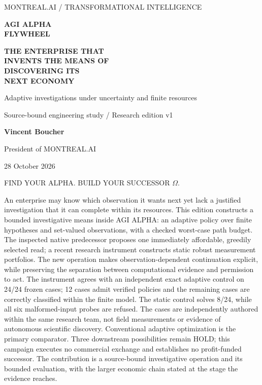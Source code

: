 \documentclass[10pt,letterpaper]{article}
\begin{document}
\begin{titlepage}
\thispagestyle{empty}
\color{purple}
{\sffamily\small MONTREAL.AI / TRANSFORMATIONAL INTELLIGENCE\par}
\vspace{1.15in}
{\sffamily\bfseries\fontsize{35}{40}\selectfont AGI ALPHA\\[.08in]FLYWHEEL\par}
\vspace{.35in}
{\sffamily\bfseries\fontsize{22}{28}\selectfont THE ENTERPRISE THAT\\INVENTS THE MEANS OF\\DISCOVERING ITS\\NEXT ECONOMY\par}
\vspace{.4in}
{\large Adaptive investigations under uncertainty and finite resources\par}
\vspace{.2in}
{\normalsize Source-bound engineering study / Research edition v1\par}
\vfill
{\large\bfseries Vincent Boucher\par}
{President of MONTREAL.AI\par}
\vspace{.2in}
{28 October 2026\par}
\vspace{.25in}
{\small\sffamily FIND YOUR ALPHA. BUILD YOUR SUCCESSOR \(\Omega\).\par}
\end{titlepage}
\setcounter{page}{1}
An enterprise may know which observation it wants next yet lack a
justified investigation that it can complete within its resources. This
edition constructs a bounded investigative means inside AGI ALPHA: an
adaptive policy over finite hypotheses and set-valued observations, with
a checked worst-case path budget. The inspected native predecessor
proposes one immediately affordable, greedily selected read; a recent
research instrument constructs static robust measurement portfolios. The
new operation makes observation-dependent continuation explicit, while
preserving the separation between computational evidence and permission
to act. The instrument agrees with an independent exact adaptive control
on 24/24 frozen cases; 12 cases admit verified policies and the
remaining cases are correctly classified within the finite model. The
static control solves 8/24, while all six malformed-input probes are
refused. The cases are independently authored within the same research
team, not field measurements or evidence of autonomous scientific
discovery. Conventional adaptive optimization is the primary comparator.
Three downstream possibilities remain HOLD; this campaign executes no
commercial exchange and establishes no profit-funded successor. The
contribution is a source-bound investigative operation and its bounded
evaluation, with the larger economic chain stated at the stage the
evidence reaches.
\end{document}
